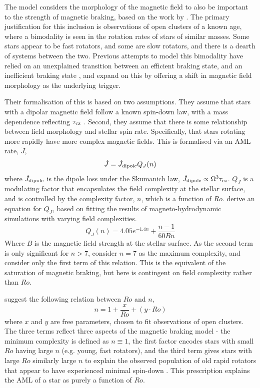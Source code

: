 The \citet{garraffo2018a} model considers the morphology of the magnetic field to also be important to the strength of magnetic braking, based on the work by \citet{garraffo2015}. The primary justification for this inclusion is observations of open clusters of a known age, where a bimodality is seen in the rotation rates of stars of similar masses. Some stars appear to be fast rotators, and some are slow rotators, and there is a dearth of systems between the two. 
Previous attempts to model this bimodality have relied on an unexplained transition between an efficient braking state, and an inefficient braking state \citep{spada2011,reiners2012, gallet2013}, and \citet{garraffo2018a} expand on this by offering a shift in magnetic field morphology as the underlying trigger.

Their formalisation of this is based on two assumptions. They assume that stars with a dipolar magnetic field follow a known spin-down law, with a mass dependence reflecting $\tau_{\rm cz}$ \citep{skumanich1972}. Second, they assume that there is some relationship between field morphology and stellar spin rate. Specifically, that stars rotating more rapidly have more complex magnetic fields. This is formalised via an AML rate, $\dot J$,
\begin{equation}
    \dot J = \dot J_{\rm dipole}Q_J(n)
\end{equation}
where $\dot J_{\rm dipole}$ is the dipole loss under the Skumanich law, $\dot J_{\rm dipole} \propto \Omega^3 \tau_{\rm cz}$. $Q_J$ is a modulating factor that encapsulates the field complexity at the stellar surface, and is controlled by the complexity factor, $n$, which is a function of $Ro$. \citet{garraffo2016} derive an equation for $Q_J$, based on fitting the results of magneto-hydrodynamic simulations with varying field complexities.
\begin{equation}
    \label{eqn:introduction:garraffo complexity modulation}
    Q_J(n) = 4.05 e^{-1.4n} + \frac{n-1}{60Bn}
\end{equation}
Where $B$ is the magnetic field strength at the stellar surface. As the second term is only significant for $n > 7$, \citet{garraffo2018a} consider $n = 7$ as the maximum complexity, and consider only the first term of this relation. This is the equivalent of the saturation of magnetic braking, but here is contingent on field complexity rather than $Ro$. 

\citet{garraffo2018a} suggest the following relation between $Ro$ and $n$,
\begin{equation}
    \label{eqn:introduction:garraffo field complexity}
    n = 1 + \frac{x}{Ro} + (y \cdot Ro)
\end{equation}
where $x$ and $y$ are free parameters, chosen to fit observations of open clusters. The three terms reflect three aspects of the magnetic braking model - the minimum complexity is defined as $n \equiv 1$, the first factor encodes stars with small $Ro$ having large $n$ (e.g. young, fast rotators), and the third term gives stars with large $Ro$ similarly large $n$ to explain the observed population of old rapid rotators that appear to have experienced minimal spin-down \citep{vanSaders2016}. 
This prescription explains the AML of a star as purely a function of $Ro$.

